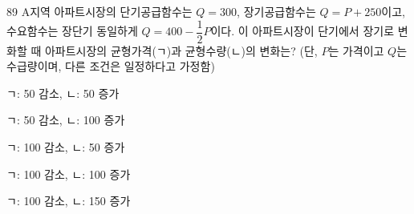 \begin{question}{89}
A지역 아파트시장의 단기공급함수는 $Q=300$, 장기공급함수는 $Q=P+250$이고, 수요함수는 장단기 동일하게 $Q=400-\dfrac{1}{2}P$이다. 이 아파트시장이 단기에서 장기로 변화할 때 아파트시장의 균형가격(ㄱ)과 균형수량(ㄴ)의 변화는? (단, $P$는 가격이고 $Q$는 수급량이며, 다른 조건은 일정하다고 가정함)
\begin{choices}
  \item ㄱ: 50 감소, ㄴ: 50 증가
  \item ㄱ: 50 감소, ㄴ: 100 증가
  \item ㄱ: 100 감소, ㄴ: 50 증가
  \item ㄱ: 100 감소, ㄴ: 100 증가
  \item ㄱ: 100 감소, ㄴ: 150 증가
\end{choices}
\end{question}

